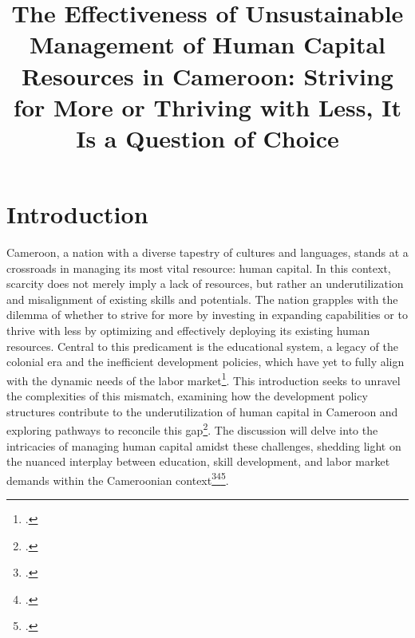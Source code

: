 \documentclass{article}
\title{The Effectiveness of Unsustainable Management of Human Capital Resources in Cameroon: Striving for More or Thriving with Less, It Is a Question of Choice}
\begin{document}
\maketitle

\section*{Introduction}

Cameroon, a nation with a diverse tapestry of cultures and languages, stands at a crossroads in managing its most vital resource: human capital. In this context, scarcity does not merely imply a lack of resources, but rather an underutilization and misalignment of existing skills and potentials. The nation grapples with the dilemma of whether to strive for more by investing in expanding capabilities or to thrive with less by optimizing and effectively deploying its existing human resources. Central to this predicament is the educational system, a legacy of the colonial era and the inefficient development policies, which have yet to fully align with the dynamic needs of the labor market\footcite{nya2016relationship}. This introduction seeks to unravel the complexities of this mismatch, examining how the development policy structures contribute to the underutilization of human capital in Cameroon and exploring pathways to reconcile this gap\footcite{kuepie2016determinants}. The discussion will delve into the intricacies of managing human capital amidst these challenges, shedding light on the nuanced interplay between education, skill development, and labor market demands within the Cameroonian context\footcite{ntamack2012education}\footcite{manguelle2021becoming}\footcite{ngwolefack2021contribution}.

\printbibliography
\end{document}
